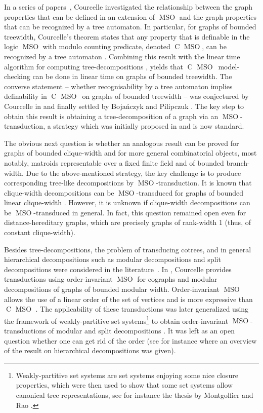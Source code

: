 \documentclass{lmcs} %
\newcommand{\MSO}{\ensuremath{\operatorname{MSO}}\xspace}
\newcommand{\CMSO}[1][]{\ensuremath{\C[#1]{\!\!}\MSO}\xspace}
\newcommand{\C}[1][]{\ensuremath{\operatorname{C}_{#1}}\xspace}
\begin{document}
In a series of papers~\cite{TMSOLOG1,TMSOLOF5,Courcelle96,Courcelle06}, Courcelle investigated the relationship between the graph properties that can be defined in an extension of \MSO and the graph properties that can be recognized by a tree automaton.
In particular, for graphs of bounded treewidth, Courcelle's theorem states that any property that is definable in the logic \MSO with modulo counting predicate, denoted \CMSO, can be recognized by a tree automaton \cite{TMSOLOG1}.
Combining this result with the linear time algorithm for computing tree-decompositions \cite{bodlaender1993linear}, yields that \CMSO\ model-checking can be done in linear time on graphs of bounded treewidth.
The converse statement -- whether recognisability by a tree automaton implies definability in \CMSO\ on graphs of bounded treewidth --
was conjectured by Courcelle in \cite{TMSOLOG1} and finally settled by Boja\'nczyk and Pilipczuk \cite{BojanczykP16}. The key step to obtain this result
is obtaining a tree-decomposition of a graph via an \MSO-transduction, a strategy which was initially proposed in \cite{TMSOLOF5} and is now standard.

The obvious next question is whether an analogous result can be proved for graphs of bounded clique-width and for more general combinatorial objects, most notably, matroids representable over a fixed finite field and of bounded branch-width. Due to the above-mentioned strategy, the key challenge is to produce corresponding tree-like decompositions by \MSO-transduction. It is known that clique-width decompositions can be \MSO-transduced for
graphs of bounded linear clique-width \cite{BojanczykGP21}. However, it is unknown if clique-width decompositions can be \MSO-transduced in general. In fact,
this question remained open even for distance-hereditary graphs, which are precisely graphs of rank-width 1 (thus, of constant clique-width). 

Besides tree-decompositions, the problem of transducing cotrees, and in general
hierarchical decompositions such as modular
decompositions and split decompositions were considered in the literature~\cite{Courcelle96,Courcelle99,Courcelle06,Courcelle13}. In \cite{Courcelle96}, Courcelle provides transductions using order-invariant \MSO for cographs and modular decompositions of
graphs of bounded modular width. Order-invariant \MSO allows the use of a linear order of the set of vertices and is more expressive than \CMSO
\cite{GanzowR08}. The applicability of these transductions was later generalized using the framework of weakly-partitive set systems\footnote{Weakly-partitive set systems are set systems enjoying some nice closure properties, which were then used
to show that some set systems allow canonical tree representations, see for instance the thesis by Montgolfier and Rao
\cite{montgolfierThesis,raoThesis}.} to obtain order-invariant
\MSO-transductions of modular and split decompositions \cite{Courcelle06}. It was left as an open question whether one can get rid of the order (see for instance
\cite{CourcelleT12} where an overview of the result on hierarchical decompositions was given).
\end{document}
